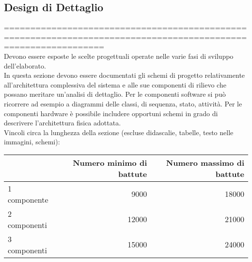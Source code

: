 \subsection*{Design di Dettaglio}




=============================================================================================================== \\
Devono essere esposte le scelte progettuali operate nelle varie fasi di sviluppo dell'elaborato.\\

In questa sezione devono essere documentati gli schemi di progetto relativamente all'architettura complessiva del sistema e alle sue componenti di rilievo che possano meritare un'analisi di dettaglio. Per le componenti software si può ricorrere ad esempio a diagrammi delle classi, di sequenza, stato, attività. Per le componenti hardware è possibile includere opportuni schemi in grado di descrivere l'architettura fisica adottata.\\

Vincoli circa la lunghezza della sezione (escluse didascalie, tabelle, testo nelle immagini, schemi):

\vspace{1cm}
\begin{tabular}{l|rr}
 & Numero minimo di battute & Numero massimo di battute \\
 \hline
 1 componente & 9000 & 18000 \\
 2 componenti & 12000 & 21000 \\
 3 componenti & 15000 & 24000 \\
 \hline
\end{tabular}


\newpage